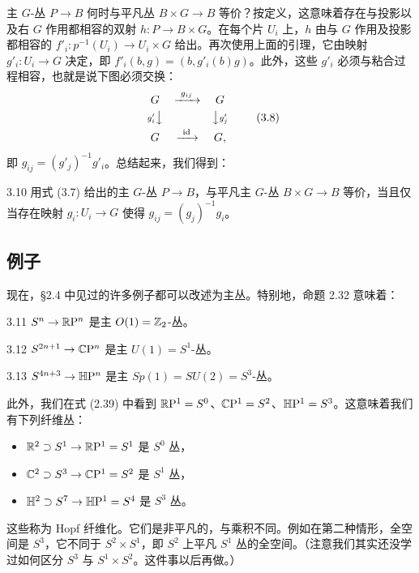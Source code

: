 主 $G$-丛 $P\to B$ 何时与平凡丛 $B\times G\to B$ 等价？按定义，这意味着存在与投影以及右 $G$ 作用都相容的双射 $h:P\to B\times G$。在每个片 $U_i$ 上，$h$ 由与 $G$ 作用及投影都相容的 $f'_i:p^{-1}(U_i)\to U_i\times G$ 给出。再次使用上面的引理，它由映射 $g'_i:U_i\to G$ 决定，即 $f'_i(b,g)=(b,g'_i(b)g)$。此外，这些 $g'_i$ 必须与粘合过程相容，也就是说下图必须交换：
\[
\begin{array}{ccc}
G & \xrightarrow{\ g_{ij}\ } & G\\[3pt]
{\scriptstyle g'_i}\big\downarrow & & \big\downarrow{\scriptstyle g'_j}\\[3pt]
G & \xrightarrow{\ \mathrm{id}\ } & G,
\end{array}
\tag{3.8}
\]
即 $g_{ij}=(g'_j)^{-1}g'_i$。总结起来，我们得到：

\begin{proposition}{3.10}
用式 (3.7) 给出的主 $G$-丛 $P\to B$，与平凡主 $G$-丛 $B\times G\to B$ 等价，当且仅当存在映射 $g_i:U_i\to G$ 使得 $g_{ij}=(g_j)^{-1}g_i$。
\end{proposition}

\subsection{例子}

现在，§2.4 中见过的许多例子都可以改述为主丛。特别地，命题 2.32 意味着：

\begin{example}{3.11}
$S^n\to\mathbb{R}\mathrm{P}^n$ 是主 $O(1)=\mathbb{Z}_2$-丛。
\end{example}

\begin{example}{3.12}
$S^{2n+1}\to\mathbb{C}\mathrm{P}^n$ 是主 $U(1)=S^1$-丛。
\end{example}

\begin{example}{3.13}
$S^{4n+3}\to\mathbb{H}\mathrm{P}^n$ 是主 $Sp(1)=SU(2)=S^3$-丛。
\end{example}

此外，我们在式 (2.39) 中看到 $\mathbb{R}\mathrm{P}^1=S^0$、$\mathbb{C}\mathrm{P}^1=S^2$、$\mathbb{H}\mathrm{P}^1=S^3$。这意味着我们有下列纤维丛：
\begin{itemize}
  \item $\mathbb{R}^2\supset S^1\to\mathbb{R}\mathrm{P}^1=S^1$ 是 $S^0$ 丛，
  \item $\mathbb{C}^2\supset S^3\to\mathbb{C}\mathrm{P}^1=S^2$ 是 $S^1$ 丛，
  \item $\mathbb{H}^2\supset S^7\to\mathbb{H}\mathrm{P}^1=S^4$ 是 $S^3$ 丛。
\end{itemize}
这些称为 Hopf 纤维化。它们是非平凡的，与乘积不同。例如在第二种情形，全空间是 $S^3$，它不同于 $S^2\times S^1$，即 $S^2$ 上平凡 $S^1$ 丛的全空间。（注意我们其实还没学过如何区分 $S^3$ 与 $S^1\times S^2$。这件事以后再做。）

